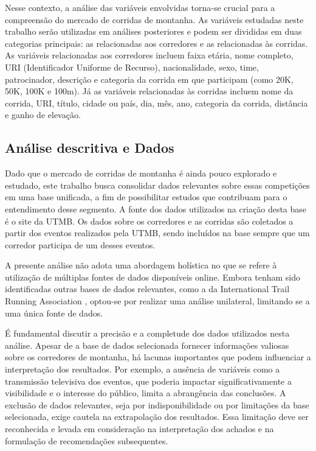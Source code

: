 Nesse contexto, a análise das variáveis
envolvidas torna-se crucial para a compreensão
do mercado de corridas de montanha. As variáveis
estudadas neste trabalho serão utilizadas em
análises posteriores e podem ser divididas em
duas categorias principais: as relacionadas aos
corredores e as relacionadas às corridas. As
variáveis relacionadas aos corredores incluem
faixa etária, nome completo, URI (Identificador
Uniforme de Recurso), nacionalidade, sexo, time,
patrocinador, descrição e categoria da corrida
em que participam (como 20K, 50K, 100K e 100m).
Já as variáveis relacionadas às corridas incluem
nome da corrida, URI, título, cidade ou país,
dia, mês, ano, categoria da corrida, distância e
ganho de elevação. 

\subsection{Análise descritiva e Dados}

Dado que o mercado de corridas de montanha é
ainda pouco explorado e estudado, este trabalho
busca consolidar dados relevantes sobre essas
competições em uma base unificada, a fim de
possibilitar estudos que contribuam para o
entendimento desse segmento. A fonte dos dados
utilizados na criação desta base é o site da
UTMB. Os dados sobre os corredores e as
corridas são coletados a partir dos eventos
realizados pela UTMB, sendo incluídos na base
sempre que um corredor participa de um desses
eventos.

A presente análise não adota uma abordagem
holística no que se refere à utilização de múltiplas fontes de dados disponíveis online. Embora tenham sido identificadas outras bases de 
dados relevantes, como a da International Trail
Running Association \cite{find_a_runner}, optou-se
por realizar uma análise unilateral, limitando
se a uma única fonte de dados.

É fundamental discutir a precisão e a completude
dos dados utilizados nesta análise. Apesar de a
base de dados selecionada fornecer informações
valiosas sobre os corredores de montanha, há
lacunas importantes que podem influenciar a
interpretação dos resultados. Por exemplo, a
ausência de variáveis como a transmissão
televisiva dos eventos, que poderia impactar
significativamente a visibilidade e o interesse
do público, limita a abrangência das conclusões.
A exclusão de dados relevantes, seja por
indisponibilidade ou por limitações da base
selecionada, exige cautela na extrapolação dos
resultados. Essa limitação deve ser reconhecida
e levada em consideração na interpretação dos
achados e na formulação de recomendações
subsequentes.

